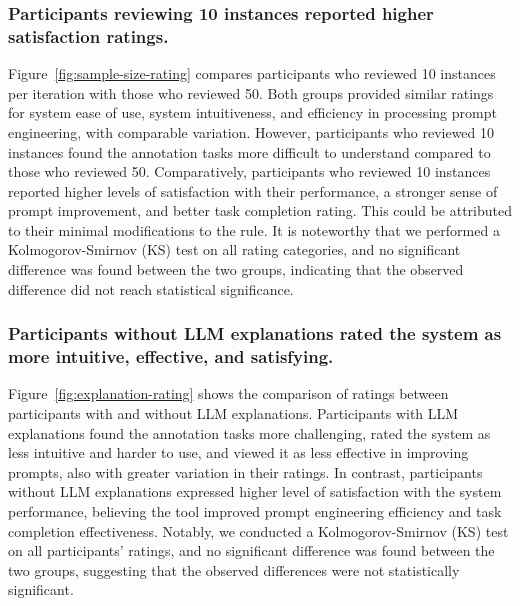 \subsubsection{Participants reviewing 10 instances reported higher satisfaction ratings.}
Figure~\ref{fig:sample-size-rating} compares participants who reviewed 10 instances per iteration with those who reviewed 50.
Both groups provided similar ratings for system ease of use, system intuitiveness, and efficiency in processing prompt engineering, with comparable variation.
However, participants who reviewed 10 instances found the annotation tasks more difficult to understand compared to those who reviewed 50. Comparatively, participants who reviewed 10 instances reported higher levels of satisfaction with their performance, a stronger sense of prompt improvement, and better task completion rating. This could be attributed to their minimal modifications to the rule.
It is noteworthy that we performed a Kolmogorov-Smirnov (KS) test on all rating categories, and no significant difference was found between the two groups, indicating that the observed difference did not reach statistical significance.


\subsubsection{Participants without LLM explanations rated the system as more intuitive, effective, and satisfying.}
Figure~\ref{fig:explanation-rating} shows the comparison of ratings between participants with and without LLM explanations.
Participants with LLM explanations found the annotation tasks more challenging, rated the system as less intuitive and harder to use, and viewed it as less effective in improving prompts, also with greater variation in their ratings. In contrast, participants without LLM explanations expressed higher level of satisfaction with the system performance, believing the tool improved prompt engineering efficiency and task completion effectiveness.
Notably, we conducted a Kolmogorov-Smirnov (KS) test on all participants' ratings, and no significant difference was found between the two groups, suggesting that the observed differences were not statistically significant.


